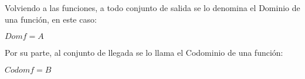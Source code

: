 \documentclass[Análisis.root.tex]{subfiles}
\begin{document}
        Volviendo a las funciones, a todo conjunto de salida se lo denomina el Dominio de una función, en este caso:
        \begin{center}
            $Dom f = A$
        \end{center}
        Por su parte, al conjunto de llegada se lo llama el Codominio de una función:
        \begin{center}
            $Codom f = B$
        \end{center}
\end{document}

